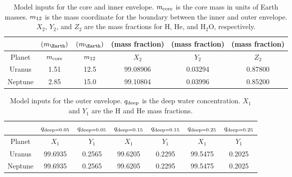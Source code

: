 \documentclass[11pt]{ucscthesisbs}
\begin{document}
\begin{table}[]
\begin{tabular}{cccccc}
                              & $(m_{\Earth})$                      & $(m_{\Earth})$                    & (mass fraction)               & (mass fraction)              & (mass fraction)              \\ \hline
\multicolumn{1}{|c|}{Planet}  & \multicolumn{1}{c|}{$m_{\rm core}$} & \multicolumn{1}{c|}{$m_{\rm 12}$} & \multicolumn{1}{c|}{$X_{2}$}  & \multicolumn{1}{c|}{$Y_{2}$} & \multicolumn{1}{c|}{$Z_{2}$} \\ \hline
\multicolumn{1}{|c|}{Uranus}  & \multicolumn{1}{c|}{1.51}           & \multicolumn{1}{c|}{12.5}         & \multicolumn{1}{c|}{99.08906} & \multicolumn{1}{c|}{0.03294} & \multicolumn{1}{c|}{0.87800} \\ \hline
\multicolumn{1}{|c|}{Neptune} & \multicolumn{1}{c|}{2.85}           & \multicolumn{1}{c|}{15.0}         & \multicolumn{1}{c|}{99.10804} & \multicolumn{1}{c|}{0.03996} & \multicolumn{1}{c|}{0.85200} \\ \hline
\end{tabular}
\caption{Model inputs for the core and inner envelope. $m_{\rm core}$ is the core mass in units of Earth masses. $m_{\rm 12}$ is the mass coordinate for the boundary between the inner and outer envelope. $X_{2}$, $Y_{2}$, and $Z_{2}$ are the mass fractions for H, He, and H$_{2}$O, respectively.}
\label{tab:core_mass_and_inner_envelope_mass_fractions}
\end{table}

\begin{table}[]
\begin{tabular}{ccccccc}
                              & $q_{\rm deep = 0.05}$        & $q_{\rm deep = 0.05}$        & $q_{\rm deep = 0.15}$        & $q_{\rm deep = 0.15}$        & $q_{\rm deep = 0.25}$        & $q_{\rm deep = 0.25}$        \\ \hline
\multicolumn{1}{|c|}{Planet}  & \multicolumn{1}{c|}{$X_{1}$} & \multicolumn{1}{c|}{$Y_{1}$} & \multicolumn{1}{c|}{$X_{1}$} & \multicolumn{1}{c|}{$Y_{1}$} & \multicolumn{1}{c|}{$X_{1}$} & \multicolumn{1}{c|}{$Y_{1}$} \\ \hline
\multicolumn{1}{|c|}{Uranus}  & \multicolumn{1}{c|}{99.6935} & \multicolumn{1}{c|}{0.2565}  & \multicolumn{1}{c|}{99.6205} & \multicolumn{1}{c|}{0.2295}  & \multicolumn{1}{c|}{99.5475} & \multicolumn{1}{c|}{0.2025}  \\ \hline
\multicolumn{1}{|c|}{Neptune} & \multicolumn{1}{c|}{99.6935} & \multicolumn{1}{c|}{0.2565}  & \multicolumn{1}{c|}{99.6205} & \multicolumn{1}{c|}{0.2295}  & \multicolumn{1}{c|}{99.5475} & \multicolumn{1}{c|}{0.2025}  \\ \hline
\end{tabular}
\caption{Model inputs for the outer envelope. $q_{\rm deep}$ is the deep water concentration. $X_{1}$ and $Y_{1}$ are the H and He mass fractions.}
\label{tab:outer_envelope_mass_fractions}
\end{table}
\end{document}
